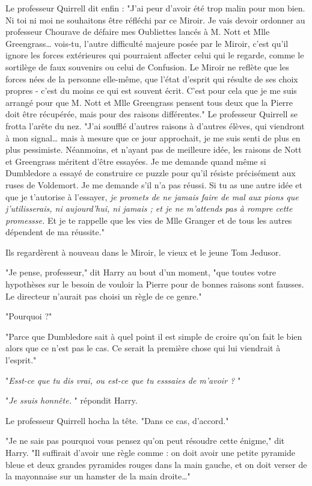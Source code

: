 Le professeur Quirrell dit enfin : "J'ai peur d'avoir été trop malin pour mon bien. Ni toi ni moi ne souhaitons être réfléchi par ce Miroir. Je vais devoir ordonner au professeur Chourave de défaire mes Oubliettes lancés à M. Nott et Mlle Greengrass… vois-tu, l'autre difficulté majeure posée par le Miroir, c'est qu'il ignore les forces extérieures qui pourraient affecter celui qui le regarde, comme le sortilège de faux souvenirs ou celui de Confusion. Le Miroir ne reflète que les forces nées de la personne elle-même, que l'état d'esprit qui résulte de ses choix propres - c'est du moins ce qui est souvent écrit. C'est pour cela que je me suis arrangé pour que M. Nott et Mlle Greengrass pensent tous deux que la Pierre doit être récupérée, mais pour des raisons différentes." Le professeur Quirrell se frotta l'arête du nez. "J'ai soufflé d'autres raisons à d'autres élèves, qui viendront à mon signal… mais à mesure que ce jour approchait, je me suis senti de plus en plus pessimiste. Néanmoins, et n'ayant pas de meilleure idée, les raisons de Nott et Greengrass méritent d'être essayées. Je me demande quand même si Dumbledore a essayé de construire ce puzzle pour qu'il résiste précisément aux ruses de Voldemort. Je me demande s'il n'a pas réussi. Si tu as une autre idée et que je t'autorise à l'essayer, \emph{je promets de ne jamais faire de mal aux pions que j'utilisserais, ni aujourd'hui, ni jamais ; et je ne m'attends pas à rompre cette promessse.}  Et je te rappelle que les vies de Mlle Granger et de tous les autres dépendent de ma réussite."

Ils regardèrent à nouveau dans le Miroir, le vieux et le jeune Tom Jedusor.

"Je pense, professeur," dit Harry au bout d'un moment, "que toutes votre hypothèses sur le besoin de vouloir la Pierre pour de bonnes raisons sont fausses. Le directeur n'aurait pas choisi un règle de ce genre."

"Pourquoi ?"

"Parce que Dumbledore sait à quel point il est simple de croire qu'on fait le bien alors que ce n'est pas le cas. Ce serait la première chose qui lui viendrait à l'esprit."

"\emph{Esst-ce que tu dis vrai, ou est-ce que tu esssaies de m'avoir ?} "

"\emph{Je ssuis honnête.} " répondit Harry.

Le professeur Quirrell hocha la tête. "Dans ce cas, d'accord."

"Je ne sais pas pourquoi vous pensez qu'on peut résoudre cette énigme," dit Harry. "Il suffirait d'avoir une règle comme : on doit avoir une petite pyramide bleue et deux grandes pyramides rouges dans la main gauche, et on doit verser de la mayonnaise sur un hamster de la main droite…"

